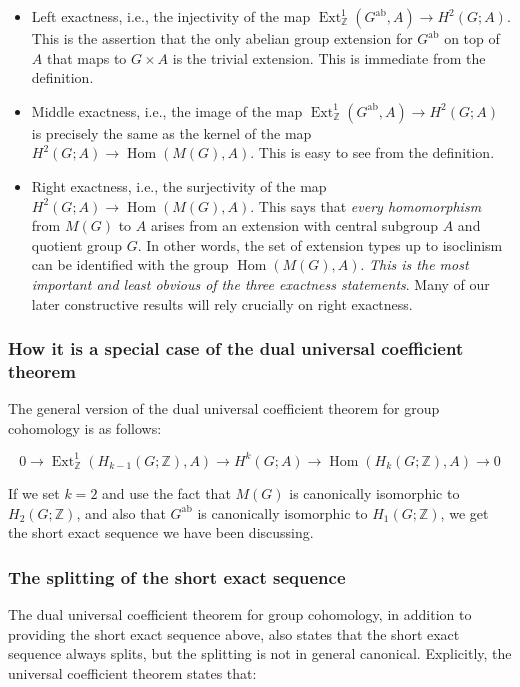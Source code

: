 \documentclass{ucetd}
\begin{document}
\begin{itemize}
\item Left exactness, i.e., the injectivity of the map
  $\operatorname{Ext}^1_{\mathbb{Z}}(G^{\operatorname{ab}},A) \to
  H^2(G;A)$. This is the assertion that the only abelian group
  extension for $G^{\operatorname{ab}}$ on top of $A$ that maps to $G
  \times A$ is the trivial extension. This is immediate from the
  definition.
\item Middle exactness, i.e., the image of the map
  $\operatorname{Ext}^1_{\mathbb{Z}}(G^{\operatorname{ab}},A) \to
  H^2(G;A)$ is precisely the same as the kernel of the map $ H^2(G;A)
  \to \operatorname{Hom}(M(G),A)$. This is easy to see from the
  definition.
\item Right exactness, i.e., the surjectivity of the map $H^2(G;A) \to
  \operatorname{Hom}(M(G),A)$. This says that {\em every homomorphism}
  from $M(G)$ to $A$ arises from an extension with central subgroup
  $A$ and quotient group $G$. In other words, the set of extension
  types up to isoclinism can be identified with the group
  $\operatorname{Hom}(M(G),A)$. {\em This is the most important and
    least obvious of the three exactness statements}. Many of our
  later constructive results will rely crucially on right exactness.
\end{itemize}

\subsubsection{How it is a special case of the dual universal coefficient theorem}

The general version of the dual universal coefficient theorem for
group cohomology is as follows:

$$0 \to \operatorname{Ext}^1_{\mathbb{Z}}(H_{k-1}(G;\mathbb{Z}),A) \to H^k(G;A) \to \operatorname{Hom}(H_k(G;\mathbb{Z}),A) \to 0$$

If we set $k = 2$ and use the fact that $M(G)$ is canonically
isomorphic to $H_2(G;\mathbb{Z})$, and also that
$G^{\operatorname{ab}}$ is canonically isomorphic to
$H_1(G;\mathbb{Z})$, we get the short exact sequence we have been
discussing.

\subsubsection{The splitting of the short exact sequence}\label{sec:ses-uct-non-canonical-splitting}

The dual universal coefficient theorem for group cohomology, in addition
to providing the short exact sequence above, also states that the
short exact sequence always splits, but the splitting is not in
general canonical. Explicitly, the universal coefficient theorem
states that:
\end{document}
